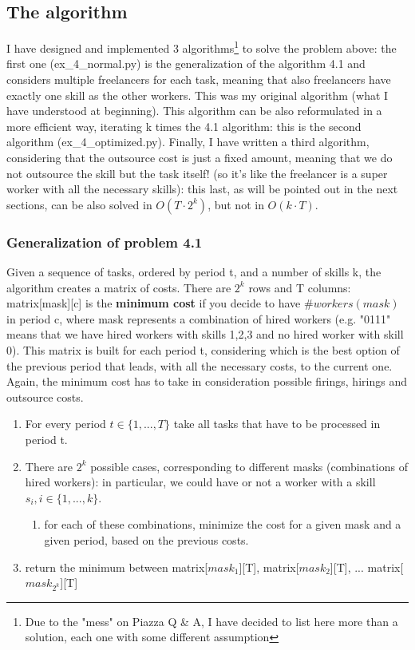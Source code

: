 \subsection{The algorithm}
I have designed and implemented 3 algorithms\footnote{Due to the "mess" on Piazza Q \& A, I have decided to list here more than a solution, each one with some different assumption} to solve the problem above: the first one (ex\_4\_normal.py) is the generalization of the algorithm 4.1 and considers multiple freelancers for each task, meaning that also freelancers have exactly one skill as the other workers. This was my original algorithm (what I have understood at beginning). This algorithm can be also reformulated in a more efficient way, iterating k times the 4.1 algorithm: this is the second algorithm (ex\_4\_optimized.py). Finally, I have written a third algorithm, considering that the outsource cost is just a fixed amount, meaning that we do not outsource the skill but the task itself! (so it's like the freelancer is a super worker with all the necessary skills): this last, as will be pointed out in the next sections, can be also solved in $O(T \cdot 2^k)$, but not in $O(k \cdot T)$.

\subsubsection{Generalization of problem 4.1}
Given a sequence of tasks, ordered by period t, and a number of skills k, the algorithm creates a matrix of costs. There are $2^k$ rows and T columns: matrix[mask][c] is the \textbf{minimum cost} if you decide to have $\# workers(mask)$ in period c, where mask represents a combination of hired workers (e.g. "0111" means that we have hired workers with skills 1,2,3 and no hired worker with skill 0). This matrix is built for each period t, considering which is the best option of the previous period that leads, with all the necessary costs, to the current one. Again, the minimum cost has to take in consideration possible firings, hirings and outsource costs.
\begin{enumerate}
	\item For every period $t \in \{1,..., T\}$ take all tasks that have to be processed in period t.
	\item There are $2^k$ possible cases, corresponding to different masks (combinations of hired workers): in particular, we could have or not a worker with a skill $s_i, i \in \{1, ..., k\}$.
	\begin{enumerate}
		\item for each of these combinations, minimize the cost for a given mask and a given period, based on the previous costs.
	\end{enumerate}
	\item return the minimum between matrix[$mask_1$][T], matrix[$mask_2$][T], ... matrix[$mask_{2^k}$][T]
\end{enumerate}


